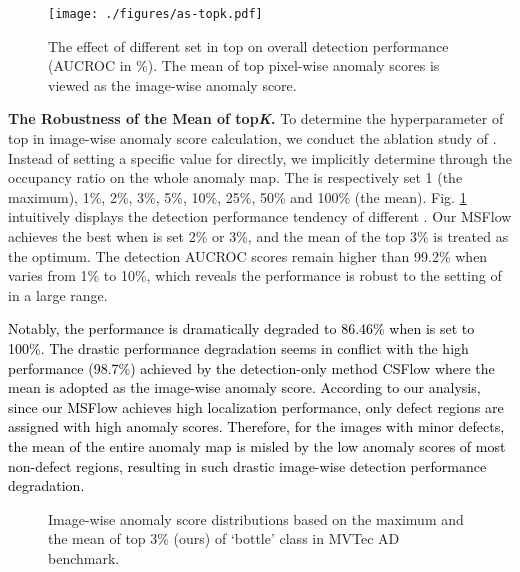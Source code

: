 \documentclass[lettersize,journal]{IEEEtran}
\newcommand{\roundb}[1]{\textcolor{black}{#1}}
\begin{document}
\begin{figure}[t]
  \centering
  \texttt{[image: ./figures/as-topk.pdf]}
  \vspace{-10.pt}
  \begin{center}
    
  \end{center}
  \vspace{-5.pt}
  \caption{The effect of different  set in top on overall detection performance (AUCROC in \%). The mean of top  pixel-wise anomaly scores is viewed as the image-wise anomaly score.}
  \label{fig:as-topk}
\end{figure}

\vspace{3pt}\textbf{The Robustness of the Mean of top\textit{K}.}
To determine the hyperparameter  of top in image-wise anomaly score calculation, we conduct the ablation study of . Instead of setting a specific value for  directly, we implicitly determine  through the occupancy ratio on the whole anomaly map. The  is respectively set 1 (the maximum), 1\%, 2\%, 3\%, 5\%, 10\%, 25\%, 50\% and 100\% (the mean). Fig. \ref{fig:as-topk} intuitively displays the detection performance tendency of different .
Our MSFlow achieves the best when  is set 2\% or 3\%, and the mean of the top 3\% is treated as the optimum. The detection AUCROC scores remain higher than 99.2\% when  varies from 1\% to 10\%, which reveals the performance is robust to the setting of  in a large range. 

\roundb{
Notably, the performance is dramatically degraded to 86.46\% when  is set to 100\%. The drastic performance degradation seems in conflict with the high performance (98.7\%) achieved by the detection-only method CSFlow \cite{rudolph2022csflow} where the mean is adopted as the image-wise anomaly score. According to our analysis, since our MSFlow achieves high localization performance, only defect regions are assigned with high anomaly scores. Therefore, for the images with minor defects, the mean of the entire anomaly map is misled by the low anomaly scores of most non-defect regions, resulting in such drastic image-wise detection performance degradation.}

\begin{figure}[!htb]
  \vspace{-5pt}
  \centering
  \hspace{3mm}
  \caption{Image-wise anomaly score distributions based on the maximum and the mean of top 3\% (ours) of `bottle' class in MVTec AD benchmark.} \label{fig:topk-viz}
\end{figure}
\end{document}
